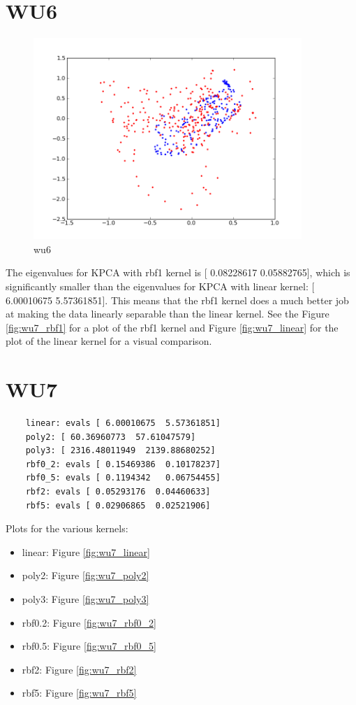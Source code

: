 \section*{WU6}
\begin{figure}[here]
	\center
	\caption{wu6}
	\label{fig:wu6}
	\includegraphics[width=4.0in]{img/wu7_rbf1.png}
\end{figure}

The eigenvalues for KPCA with rbf1 kernel is [ 0.08228617  0.05882765], which is significantly smaller than
the eigenvalues for KPCA with linear kernel: [ 6.00010675  5.57361851]. This means that the rbf1 kernel does a much 
better job at making the data linearly separable than the linear kernel. See the Figure \ref{fig:wu7_rbf1} for a plot of the rbf1 kernel and Figure \ref{fig:wu7_linear} for the plot of the linear kernel for a visual comparison.

\section*{WU7}
\begin{verbatim}
	linear: evals [ 6.00010675  5.57361851]
	poly2: [ 60.36960773  57.61047579]
	poly3: [ 2316.48011949  2139.88680252]
	rbf0_2: evals [ 0.15469386  0.10178237]
	rbf0_5: evals [ 0.1194342   0.06754455]
	rbf2: evals [ 0.05293176  0.04460633]
	rbf5: evals [ 0.02906865  0.02521906]
\end{verbatim}
Plots for the various kernels:
\begin{itemize}
	\item linear: Figure \ref{fig:wu7_linear}
	\item poly2: Figure \ref{fig:wu7_poly2}
	\item poly3: Figure \ref{fig:wu7_poly3}
	\item rbf0.2: Figure \ref{fig:wu7_rbf0_2}
	\item rbf0.5: Figure \ref{fig:wu7_rbf0_5}
	\item rbf2: Figure \ref{fig:wu7_rbf2}
	\item rbf5: Figure \ref{fig:wu7_rbf5}
\end{itemize}


